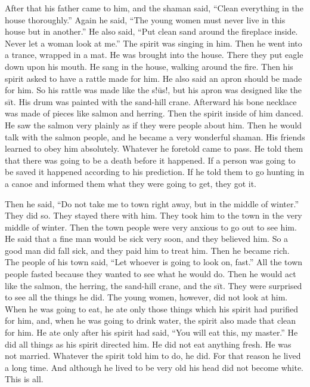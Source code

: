 After that his father came to him, and the shaman said, \qqk{}“Clean everything in the house thoroughly.” Again he said, \qqk{}“The young women must never live in this house but in another.” He also said, \qqk{}“Put clean sand around the fireplace inside.
Never let a woman look at me.” The spirit was singing in him.
Then he went into a trance, wrapped in a mat.
He was brought into the house.
There they put eagle down upon his mouth.
He sang in the house, walking around the fire.
Then his spirit asked to have a rattle made for him.
He also said an apron should be made for him.
So his rattle was made like the s!ūs!, but his apron was designed like the sīt.
His drum was painted with the sand-hill crane.
Afterward his bone necklace was made of pieces like salmon and herring.
Then the spirit inside of him danced.
He saw the salmon very plainly as if they were people about him.
Then he would talk with the salmon people, and he became a very wonderful shaman.
His friends learned to obey him absolutely.
Whatever he foretold came to pass.
He told them that there was going to be a death before it happened.
If a person was going to be saved it happened according to his prediction.
If he told them to go hunting in a canoe and informed them what they were going to get, they got it.

Then he said, \qqk{}“Do not take me to town right away, but in the middle of winter.” They did so.
They stayed there with him.
They took him to the town in the very middle of winter.
Then the town people were very anxious to go out to see him.
He said that a fine man would be sick very soon, and they believed him.
So a good man did fall sick, and they paid him to treat him.
Then he became rich.
The people of his town said, \qqk{}“Let whoever is going to look on, fast.” All the town people fasted because they wanted to see what he would do.
Then he would act like the salmon, the herring, the sand-hill crane, and the sīt.
They were surprised to see all the things he did.
The young women, however, did not look at him.
When he was going to eat, he ate only those things which his spirit had purified for him, and, when he was going to drink water, the spirit also made that clean for him.
He ate only after his spirit had said, \qqk{}“You will eat this, my master.” He did all things as his spirit directed him.
He did not eat anything fresh.
He was not married.
Whatever the spirit told him to do, he did.
For that reason he lived a long time.
And although he lived to be very old his head did not become white.
This is all.

